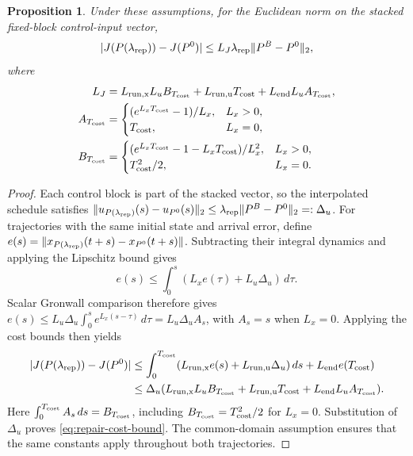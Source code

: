 \documentclass[final]{cas-sc}
\theoremstyle{definition}
\theoremstyle{plain}
\newtheorem{proposition}{Proposition}
\theoremstyle{definition}
\theoremstyle{plain}
\begin{document}
\begin{proposition}
\label{prop:repair-cost}
Under these assumptions, for the Euclidean norm on the stacked fixed-block
control-input vector,
\begin{equation}
|J(P(\lambda_{\rm rep}))-J(P^0)|
\le L_J\lambda_{\rm rep}\|P^B-P^0\|_2,
\label{eq:repair-cost-bound}
\end{equation}
where
\begin{align*}
L_J&=L_{\rm run,x}L_u B_{T_{\rm cost}}+L_{\rm run,u}T_{\rm cost}+L_{\rm end}L_u A_{T_{\rm cost}},\\
A_{T_{\rm cost}}&=\begin{cases}(e^{L_xT_{\rm cost}}-1)/L_x,&L_x>0,\\T_{\rm cost},&L_x=0,\end{cases}\\
B_{T_{\rm cost}}&=\begin{cases}(e^{L_xT_{\rm cost}}-1-L_xT_{\rm cost})/L_x^2,&L_x>0,\\T_{\rm cost}^2/2,&L_x=0.\end{cases}
\end{align*}
\end{proposition}

\begin{proof}
Each control block is part of the stacked vector, so the interpolated
schedule satisfies
$\|u_{P(\lambda_{\rm rep})}(s)-u_{P^0}(s)\|_2\le
\lambda_{\rm rep}\|P^B-P^0\|_2=:\Delta_u$.
For trajectories with the same initial state and arrival error, define
$e(s)=\|x_{P(\lambda_{\rm rep})}(t+s)-x_{P^0}(t+s)\|$.
Subtracting their integral dynamics and applying the Lipschitz bound gives
\[
 e(s)\le\int_0^s(L_xe(\tau)+L_u\Delta_u)\,d\tau.
\]
Scalar Gronwall comparison therefore gives
$e(s)\le L_u\Delta_u\int_0^s e^{L_x(s-\tau)}\,d\tau=L_u\Delta_u A_s$,
with $A_s=s$ when $L_x=0$. Applying the cost bounds then yields
\[
\begin{aligned}
 |J(P(\lambda_{\rm rep}))-J(P^0)|
 &\le\int_0^{T_{\rm cost}}(L_{\rm run,x}e(s)+L_{\rm run,u}\Delta_u)\,ds+L_{\rm end}e(T_{\rm cost})\\
 &\le\Delta_u(L_{\rm run,x}L_uB_{T_{\rm cost}}+L_{\rm run,u}T_{\rm cost}+L_{\rm end}L_uA_{T_{\rm cost}}).
\end{aligned}
\]
Here $\int_0^{T_{\rm cost}} A_s\,ds=B_{T_{\rm cost}}$, including $B_{T_{\rm cost}}=T_{\rm cost}^2/2$ for $L_x=0$.
Substitution of $\Delta_u$ proves \eqref{eq:repair-cost-bound}.
The common-domain assumption ensures that the same constants apply
throughout both trajectories.
\end{proof}
\end{document}
